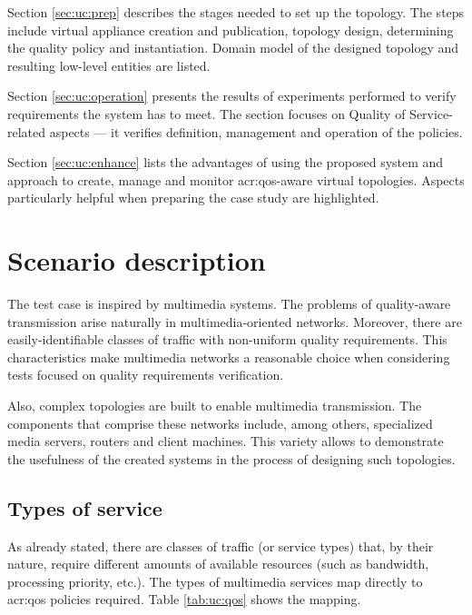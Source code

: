 \documentclass[11pt]{book}
\begin{document}
    Section \ref{sec:uc:prep} describes the stages needed to set up the topology. The steps include virtual appliance
    creation and publication, topology design, determining the quality policy and instantiation. Domain model of the
    designed topology and resulting low-level entities are listed.

    Section \ref{sec:uc:operation} presents the results of experiments performed to verify requirements the system has
    to meet. The section focuses on Quality of Service-related aspects --- it verifies definition, management and
    operation of the policies.

    Section \ref{sec:uc:enhance} lists the advantages of using the proposed system and approach to create, manage and
    monitor \gls{acr:qos}-aware virtual topologies. Aspects particularly helpful when preparing the case study are highlighted.


    \section{Scenario description}
    \label{sec:uc:description}

      The test case is inspired by multimedia systems. The problems of quality-aware transmission arise naturally
      in multimedia-oriented networks. Moreover, there are easily-identifiable classes of traffic with non-uniform
      quality requirements. This characteristics make multimedia networks a reasonable choice when considering tests
      focused on quality requirements verification.
      
      Also, complex topologies are built to enable multimedia transmission. The components that comprise these networks
      include, among others, specialized media servers, routers and client machines. This variety allows to demonstrate
      the usefulness of the created systems in the process of designing such topologies.


      \subsection{Types of service}
      
        As already stated, there are classes of traffic (or service types) that, by their nature, require different
        amounts of available resources (such as bandwidth, processing priority, etc.). The types of multimedia services
        map directly to \gls{acr:qos} policies required. Table \ref{tab:uc:qos} shows the mapping.
\end{document}
